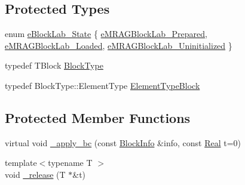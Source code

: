\subsection*{Protected Types}
\begin{DoxyCompactItemize}
\item 
enum \hyperlink{class_block_lab_ad3a1e6e1a1002fb812d6853c8ac1ec9e}{e\+Block\+Lab\+\_\+\+State} \{ \hyperlink{class_block_lab_ad3a1e6e1a1002fb812d6853c8ac1ec9ea6c1a64be2e953c6093dab00aab32fe00}{e\+M\+R\+A\+G\+Block\+Lab\+\_\+\+Prepared}, 
\hyperlink{class_block_lab_ad3a1e6e1a1002fb812d6853c8ac1ec9eadaaa507dbe601b991a383e6a0701a09c}{e\+M\+R\+A\+G\+Block\+Lab\+\_\+\+Loaded}, 
\hyperlink{class_block_lab_ad3a1e6e1a1002fb812d6853c8ac1ec9ead9471f6585bd7cf7ddc9edad96e67362}{e\+M\+R\+A\+G\+Block\+Lab\+\_\+\+Uninitialized}
 \}
\item 
typedef T\+Block \hyperlink{class_block_lab_a745b3c9ac17f6743d11a7085196981a0}{Block\+Type}
\item 
typedef Block\+Type\+::\+Element\+Type \hyperlink{class_block_lab_ad547d74881a0d226a849e2051af6b26b}{Element\+Type\+Block}
\end{DoxyCompactItemize}
\subsection*{Protected Member Functions}
\begin{DoxyCompactItemize}
\item 
virtual void \hyperlink{class_block_lab_a669ac139b57be4967e5f43bc649a8520}{\+\_\+apply\+\_\+bc} (const \hyperlink{struct_block_info}{Block\+Info} \&info, const \hyperlink{_h_d_f5_dumper_8h_a445a5f0e2a34c9d97d69a3c2d1957907}{Real} t=0)
\item 
{\footnotesize template$<$typename T $>$ }\\void \hyperlink{class_block_lab_ab23c907953858c8b393a9910ecf5b1cf}{\+\_\+release} (T $\ast$\&t)
\end{DoxyCompactItemize}
